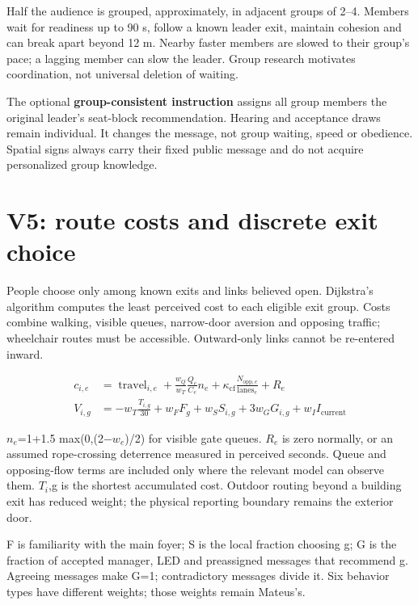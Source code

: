 \documentclass[11pt,a4paper]{article}
\begin{document}
Half the audience is grouped, approximately, in adjacent groups of 2–4. Members wait for readiness up to 90 s, follow a known leader exit, maintain cohesion and can break apart beyond 12 m. Nearby faster members are slowed to their group's pace; a lagging member can slow the leader. Group research \cite{R13,R14} motivates coordination, not universal deletion of waiting.


The optional \textbf{group-consistent instruction} assigns all group members the original leader's seat-block recommendation. Hearing and acceptance draws remain individual. It changes the message, not group waiting, speed or obedience. Spatial signs always carry their fixed public message and do not acquire personalized group knowledge.


\section{V5: route costs and discrete exit choice}\label{sec:7}

People choose only among known exits and links believed open. Dijkstra's algorithm computes the least perceived cost to each eligible exit group. Costs combine walking, visible queues, narrow-door aversion and opposing traffic; wheelchair routes must be accessible. Outward-only links cannot be re-entered inward.


\begin{equation}
\begin{aligned}
c_{i,e}&=\operatorname{travel}_{i,e}+\frac{w_Q}{w_T}\frac{Q_e}{C_e}n_e+\kappa_{\mathrm{cf}}\frac{N_{\mathrm{opp},e}}{\operatorname{lanes}_e}+R_e \\
V_{i,g}&=-w_T\frac{T_{i,g}}{30}+w_FF_g+w_SS_{i,g}+3w_GG_{i,g}+w_II_{\mathrm{current}}
\end{aligned}
\tag{10}\label{eq:10}
\end{equation}

\ensuremath{n_{e}}=1+1.5 max(0,(2\ensuremath{-}\ensuremath{w_{e}})/2) for visible gate queues. \ensuremath{R_{e}} is zero normally, or an assumed rope-crossing deterrence measured in perceived seconds. Queue and opposing-flow terms are included only where the relevant model can observe them. \ensuremath{T_{i}},g is the shortest accumulated cost. Outdoor routing beyond a building exit has reduced weight; the physical reporting boundary remains the exterior door.


F is familiarity with the main foyer; S is the local fraction choosing g; G is the fraction of accepted manager, LED and preassigned messages that recommend g. Agreeing messages make G=1; contradictory messages divide it. Six behavior types have different weights; those weights remain Mateus's.
\end{document}
